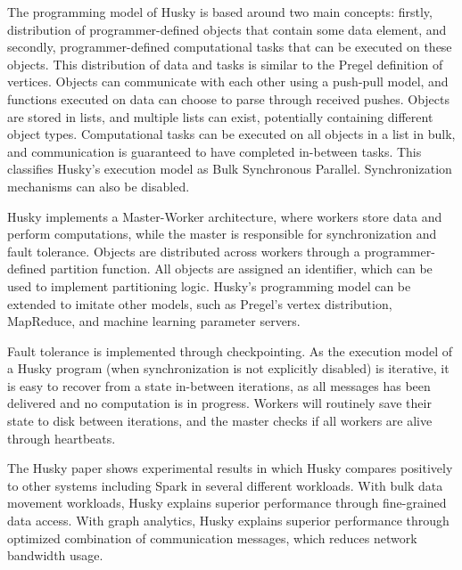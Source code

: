 \documentclass{uit-report}
\begin{document}
The programming model of Husky is based around two main concepts: firstly, distribution of programmer-defined objects that contain some data element, and secondly, programmer-defined computational tasks that can be executed on these objects. This distribution of data and tasks is similar to the Pregel definition of vertices. Objects can communicate with each other using a push-pull model, and functions executed on data can choose to parse through received pushes. Objects are stored in lists, and multiple lists can exist, potentially containing different object types. Computational tasks can be executed on all objects in a list in bulk, and communication is guaranteed to have completed in-between tasks. This classifies Husky's execution model as Bulk Synchronous Parallel. Synchronization mechanisms can also be disabled.

Husky implements a Master-Worker architecture, where workers store data and perform computations, while the master is responsible for synchronization and fault tolerance. Objects are distributed across workers through a programmer-defined partition function. All objects are assigned an identifier, which can be used to implement partitioning logic. Husky's programming model can be extended to imitate other models, such as Pregel's vertex distribution, MapReduce, and machine learning parameter servers.

Fault tolerance is implemented through checkpointing. As the execution model of a Husky program (when synchronization is not explicitly disabled) is iterative, it is easy to recover from a state in-between iterations, as all messages has been delivered and no computation is in progress. Workers will routinely save their state to disk between iterations, and the master checks if all workers are alive through heartbeats. 

The Husky paper shows experimental results in which Husky compares positively to other systems including Spark in several different workloads. With bulk data movement workloads, Husky explains superior performance through fine-grained data access. With graph analytics, Husky explains superior performance through optimized combination of communication messages, which reduces network bandwidth usage. 


\newpage
\end{document}
